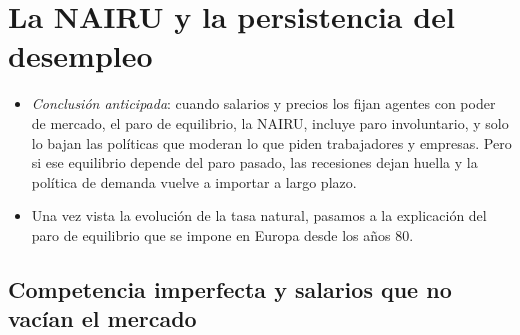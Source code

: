 \documentclass[11pt]{article}
\begin{document}
\section{La NAIRU y la persistencia del desempleo}\label{sec:neokeynesiano}

\begin{itemize}
\item \emph{Conclusión anticipada}: cuando salarios y precios los fijan agentes con poder de mercado, el paro de equilibrio, la NAIRU, incluye paro involuntario, y solo lo bajan las políticas que moderan lo que piden trabajadores y empresas. Pero si ese equilibrio depende del paro pasado, las recesiones dejan huella y la política de demanda vuelve a importar a largo plazo.
\item Una vez vista la evolución de la tasa natural, pasamos a la explicación del paro de equilibrio que se impone en Europa desde los años 80.
\end{itemize}

\subsection{Competencia imperfecta y salarios que no vacían el mercado}\label{sec:nek}
\end{document}
